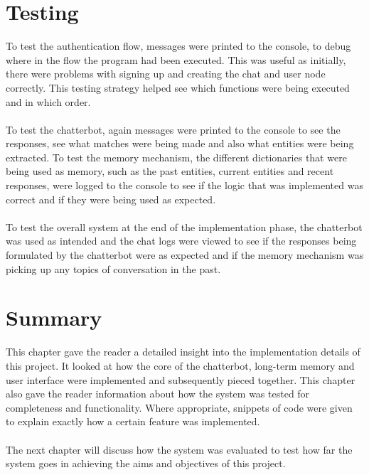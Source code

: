 \section{Testing}
To test the authentication flow, messages were printed to the console, to debug where in the flow the program had been executed. This was useful as initially, there were problems with signing up and creating the chat and user node correctly. This testing strategy helped see which functions were being executed and in which order. \\\\
To test the chatterbot, again messages were printed to the console to see the responses, see what matches were being made and also what entities were being extracted. To test the memory mechanism, the different dictionaries that were being used as memory, such as the past entities, current entities and recent responses, were logged to the console to see if the logic that was implemented was correct and if they were being used as expected.\\\\
To test the overall system at the end of the implementation phase, the chatterbot was used as intended and the chat logs were viewed to see if the responses being formulated by the chatterbot were as expected and if the memory mechanism was picking up any topics of conversation in the past. 
\section{Summary}
This chapter gave the reader a detailed insight into the implementation details of this project. It looked at how the core of the chatterbot, long-term memory and user interface were implemented and subsequently pieced together. This chapter also gave the reader information about how the system was tested for completeness and functionality. Where appropriate, snippets of code were given to explain exactly how a certain feature was implemented.\\\\
The next chapter will discuss how the system was evaluated to test how far the system goes in achieving the aims and objectives of this project.